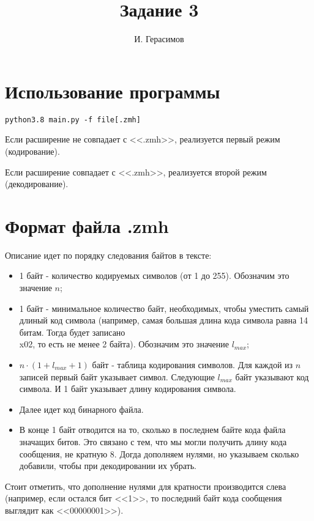 \documentclass{article}
\title{Задание 3}
\author{И. Герасимов}
\date{}
\begin{document}
\maketitle

\section{Использование программы}

\begin{verbatim}
python3.8 main.py -f file[.zmh]
\end{verbatim}

Если расширение не совпадает с <<.zmh>>, реализуется первый режим (кодирование).

Если расширение совпадает с <<.zmh>>, реализуется второй режим (декодирование).

\section{Формат файла .zmh}

Описание идет по порядку следования байтов в тексте:

\begin{itemize}
\item 1 байт - количество кодируемых символов (от 1 до 255). Обозначим это значение $n$;
\item 1 байт - минимальное количество байт, необходимых, чтобы уместить самый длиный код символа (например, самая большая длина кода символа равна 14 битам. Тогда будет записано \\x02, то есть не менее 2 байта). Обозначим это значение $l_{max}$;
\item $n\cdot(1 + l_{max} + 1)$ байт - таблица кодирования символов. Для каждой из $n$ записей первый байт указывает символ. Следующие $l_{max}$ байт указывают код символа. И 1 байт указывает длину кодирования символа.
\item Далее идет код бинарного файла.
\item В конце 1 байт отводится на то, сколько в последнем байте кода файла значащих битов. Это связано с тем, что мы могли получить длину кода сообщения, не кратную 8. Догда дополняем нулями, но указываем сколько добавили, чтобы при декодировании их убрать.
\end{itemize}

Стоит отметить, что дополнение нулями для кратности производится слева (например, если остался бит <<1>>, то последний байт кода сообщения выглядит как <<00000001>>).
\end{document}

